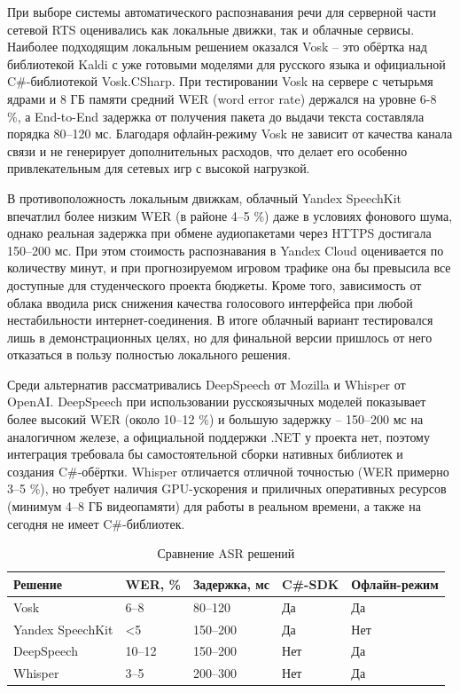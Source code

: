         При выборе системы автоматического распознавания речи для серверной части сетевой RTS оценивались как локальные движки, так и облачные сервисы. Наиболее подходящим локальным решением оказался 
        Vosk -- это обёртка над библиотекой Kaldi с уже готовыми моделями для русского языка и официальной C\#-библиотекой Vosk.CSharp. При тестировании Vosk на сервере с четырьмя ядрами и 8 ГБ 
        памяти средний WER (word error rate) держался на уровне 6-8 \%, а End-to-End задержка от получения пакета до выдачи текста 
        состав­ляла порядка 80–120 мс. Благодаря офлайн-режиму Vosk не зависит от качества канала связи и не генерирует дополнительных расходов, что делает его особенно привлекательным для 
        сетевых игр с высокой нагрузкой.

        В противоположность локальным движкам, облачный Yandex SpeechKit впечатлил более низким WER (в районе 4–5 \%) даже в условиях фонового шума, однако реальная задержка при обмене
        аудиопакетами через HTTPS достигала 150–200 мс. При этом стоимость распознавания в Yandex Cloud оценивается по количеству минут, и при прогнозируемом игровом трафике она бы превысила
        все доступные для студенческого проекта бюджеты. Кроме того, зависимость от облака вводила риск снижения качества голосового интерфейса при любой нестабильности интернет-соединения. 
        В итоге облачный вариант тестировался лишь в демонстрационных целях, но для финальной версии пришлось от него отказаться в пользу полностью локального решения.

        Среди альтернатив рассматривались DeepSpeech от Mozilla и Whisper от OpenAI. DeepSpeech при использовании русскоязычных моделей показывает более высокий WER (около 10–12 \%) и большую 
        задержку -- 150–200 мс на аналогичном железе, а официальной поддержки .NET у проекта нет, поэтому интеграция требовала бы самостоятельной сборки нативных библиотек и создания C\#-обёртки. 
        Whisper отличается отличной точностью (WER примерно 3–5 \%), но требует наличия GPU-ускорения и приличных оперативных ресурсов (минимум 4–8 ГБ видеопамяти) для работы в реальном времени, 
        а также на сегодня не имеет C\#-библиотек.


        \begin{table}[ht]
            \caption{Сравнение ASR решений}
            \centering
            \renewcommand{\arraystretch}{1.2}
            \renewcommand{\tablename}{Табл.}
            \begin{tabularx}{\textwidth}{|X|X|X|X|X|}
            \hline
            \textbf{Решение} & \textbf{WER, \%} & \textbf{Задержка, мс} & \textbf{C\#-SDK} & \textbf{Офлайн-режим} \\
            \hline
            Vosk&6–8&80–120&Да&Да \\
            \hline
            Yandex SpeechKit&<5&150–200&Да&Нет \\
            \hline
            DeepSpeech&10–12&150–200&Нет&Да\\
            \hline
            Whisper&3–5&200–300&Нет&Да\\
            \hline
            \end{tabularx}
        \end{table}

